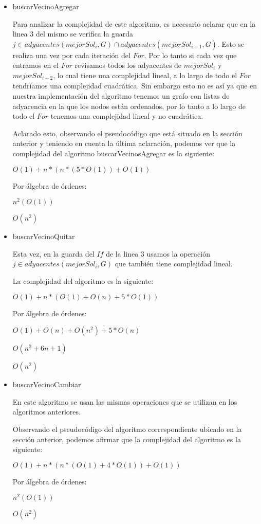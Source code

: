 \begin{itemize}
 \item buscarVecinoAgregar

  Para analizar la complejidad de este algoritmo, es necesario aclarar que en la linea $3$ del mismo se verifica la guarda $j \in adyacentes(mejorSol_i,G) \cap adyacentes(mejorSol_{i+1},G)$. Esto se realiza una vez por cada iteración del $For$. Por lo tanto si cada vez que entramos en el $For$ revisamos todos los adyacentes de $mejorSol_i$ y $mejorSol_{i+2}$, lo cual tiene una complejidad lineal, a lo largo de todo el $For$ tendríamos una complejidad cuadrática. Sin embargo esto no es así ya que en nuestra implementación del algoritmo tenemos un grafo con listas de adyacencia en la que los nodos están ordenados, por lo tanto a lo largo de todo el $For$ tenemos una complejidad lineal y no cuadrática.

  Aclarado esto, observando el pseudocódigo que está situado en la sección anterior y teniendo en cuenta la última aclaración, podemos ver que la complejidad del algoritmo buscarVecinosAgregar es la siguiente:

  $O(1) + n*(n*(5*O(1))+O(1))$

  Por álgebra de órdenes:

  $n^2(O(1))$

  $O(n^2)$

  \item buscarVecinoQuitar

  Esta vez, en la guarda del $If$ de la linea $3$ usamos la operación $j \in adyacentes(mejorSol_i, G)$ que también tiene complejidad lineal.

  La complejidad del algoritmo es la siguiente:

  $O(1)+n*(O(1)+O(n)+5*O(1))$

  Por álgebra de órdenes:

  $O(1)+O(n)+O(n^2)+5*O(n)$

  $O(n^2+6n+1)$

  $O(n^2)$

  \item buscarVecinoCambiar

  En este algoritmo se usan las mismas operaciones que se utilizan en los algoritmos anteriores.

  Observando el pseudocódigo del algoritmo correspondiente ubicado en la sección anterior, podemos afirmar que la complejidad del algoritmo es la siguiente:

  $O(1) + n*(n*(O(1) +4*O(1))+O(1))$

  Por álgebra de órdenes:

  $n^2(O(1))$

  $O(n^2)$

\end{itemize}



